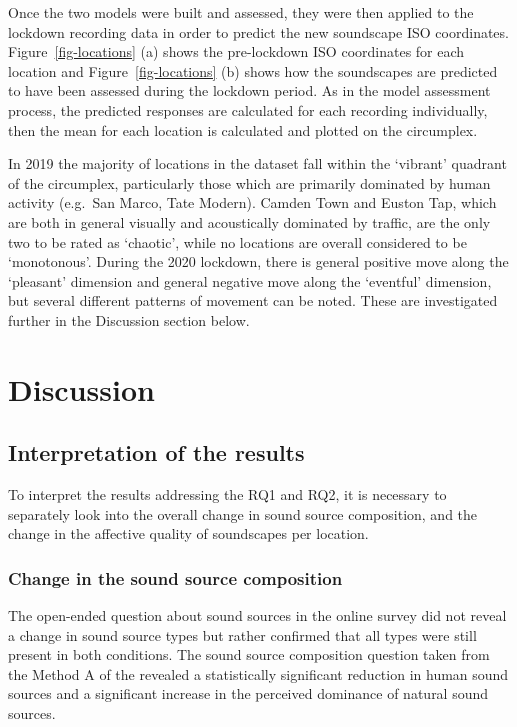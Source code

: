 \documentclass[
  authoryear,
  preprint,
  3p,
  onecolumn]{elsarticle}
\begin{document}
Once the two models were built and assessed, they were then applied to
the lockdown recording data in order to predict the new soundscape ISO
coordinates. Figure~\ref{fig-locations} (a) shows the pre-lockdown ISO
coordinates for each location and Figure~\ref{fig-locations} (b) shows
how the soundscapes are predicted to have been assessed during the
lockdown period. As in the model assessment process, the predicted
responses are calculated for each recording individually, then the mean
for each location is calculated and plotted on the circumplex.

In 2019 the majority of locations in the dataset fall within the
`vibrant' quadrant of the circumplex, particularly those which are
primarily dominated by human activity (e.g.~San Marco, Tate Modern).
Camden Town and Euston Tap, which are both in general visually and
acoustically dominated by traffic, are the only two to be rated as
`chaotic', while no locations are overall considered to be `monotonous'.
During the 2020 lockdown, there is general positive move along the
`pleasant' dimension and general negative move along the `eventful'
dimension, but several different patterns of movement can be noted.
These are investigated further in the Discussion section below.

\section{Discussion}\label{discussion}

\subsection{Interpretation of the
results}\label{interpretation-of-the-results}

To interpret the results addressing the RQ1 and RQ2, it is necessary to
separately look into the overall change in sound source composition, and
the change in the affective quality of soundscapes per location.

\subsubsection{Change in the sound source
composition}\label{change-in-the-sound-source-composition}

The open-ended question about sound sources in the online survey did not
reveal a change in sound source types but rather confirmed that all
types were still present in both conditions. The sound source
composition question taken from the Method A of the
\citet{ISO12913Part2} revealed a statistically significant reduction in
human sound sources and a significant increase in the perceived
dominance of natural sound sources.
\end{document}
